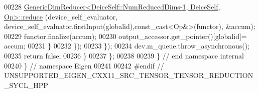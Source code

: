 \begin{DoxyCode}
00228           \hyperlink{struct_eigen_1_1internal_1_1_generic_dim_reducer}{GenericDimReducer<DeiceSelf::NumReducedDims-1, DeiceSelf, Op>::reduce}
      (device\_self\_evaluator, device\_self\_evaluator.firstInput(globalid),\textcolor{keyword}{const\_cast<}Op&\textcolor{keyword}{>}(functor), &accum);
00229           functor.finalize(accum);
00230           output\_accessor.get\_pointer()[globalid]= accum;
00231         \}
00232       \});
00233     \});
00234   dev.m\_queue.throw\_asynchronous();
00235     \textcolor{keywordflow}{return} \textcolor{keyword}{false};
00236   \}
00237 \};
00238 
00239 \}  \textcolor{comment}{// end namespace internal}
00240 \}  \textcolor{comment}{// namespace Eigen}
00241 
00242 \textcolor{preprocessor}{#endif  // UNSUPPORTED\_EIGEN\_CXX11\_SRC\_TENSOR\_TENSOR\_REDUCTION\_SYCL\_HPP}
\end{DoxyCode}
